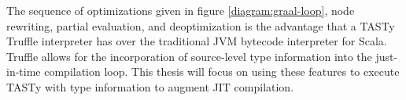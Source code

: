 The sequence of optimizations given in figure \ref{diagram:graal-loop}, node rewriting, partial evaluation, and deoptimization is the advantage that a TASTy Truffle interpreter has over the traditional JVM bytecode interpreter for Scala.
Truffle allows for the incorporation of source-level type information into the just-in-time compilation loop.
This thesis will focus on using these features to execute TASTy with type information to augment JIT compilation.


